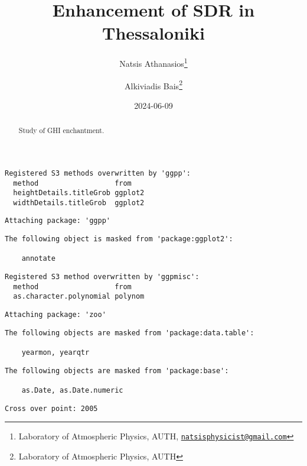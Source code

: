 \documentclass[
  10pt,
  a4paper,oneside]{article}
\title{Enhancement of SDR in Thessaloniki}
\author{Natsis Athanasios\footnote{Laboratory of Atmospheric Physics, AUTH, \href{mailto:natsisphysicist@gmail.com}{\nolinkurl{natsisphysicist@gmail.com}}} \and Alkiviadis Bais\footnote{Laboratory of Atmospheric Physics, AUTH}}
\date{2024-06-09}
\begin{document}
\maketitle
\begin{abstract}
Study of GHI enchantment.
\end{abstract}

{
\hypersetup{linkcolor=}
\setcounter{tocdepth}{4}
\tableofcontents
}
\begin{verbatim}
Registered S3 methods overwritten by 'ggpp':
  method                  from   
  heightDetails.titleGrob ggplot2
  widthDetails.titleGrob  ggplot2
\end{verbatim}

\begin{verbatim}
Attaching package: 'ggpp'
\end{verbatim}

\begin{verbatim}
The following object is masked from 'package:ggplot2':

    annotate
\end{verbatim}

\begin{verbatim}
Registered S3 method overwritten by 'ggpmisc':
  method                  from   
  as.character.polynomial polynom
\end{verbatim}

\begin{verbatim}
Attaching package: 'zoo'
\end{verbatim}

\begin{verbatim}
The following objects are masked from 'package:data.table':

    yearmon, yearqtr
\end{verbatim}

\begin{verbatim}
The following objects are masked from 'package:base':

    as.Date, as.Date.numeric
\end{verbatim}

\begin{verbatim}
Cross over point: 2005 
\end{verbatim}
\end{document}
